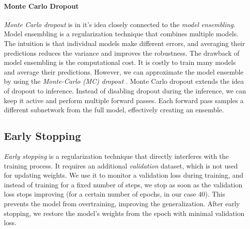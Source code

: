\paragraph{Monte Carlo Dropout}

\emph{Monte Carlo dropout} is in it's idea closely connected to the \emph{model ensembling}. Model ensembling is a regularization technique that combines multiple models. The intuition is that individual models make different errors, and averaging their predictions reduces the variance and improves the robustness. The drawback of model ensembling is the computational cost. It is costly to train many models and average their predictions. However, we can approximate the model ensemble by using the \emph{Monte-Carlo (MC) dropout} \cite{gal2016dropout}. Monte Carlo dropout extends the idea of dropout to inference. Instead of disabling dropout during the inference, we can keep it active and perform multiple forward passes. Each forward pass samples a different subnetwork from the full model, effectively creating an ensemble.

\subsection{Early Stopping}

\emph{Early stopping} \cite{prechelt2002early} is a regularization technique that directly interferes with the training process. It requires an additional \emph{validation} dataset, which is not used for updating weights. We use it to monitor a  validation loss during training, and instead of training for a fixed number of steps, we stop as soon as the validation loss stops improving (for a certain number of epochs, in our case $40$). This prevents the model from overtraining, improving the generalization. After early stopping, we restore the model's weights from the epoch with minimal validation loss.